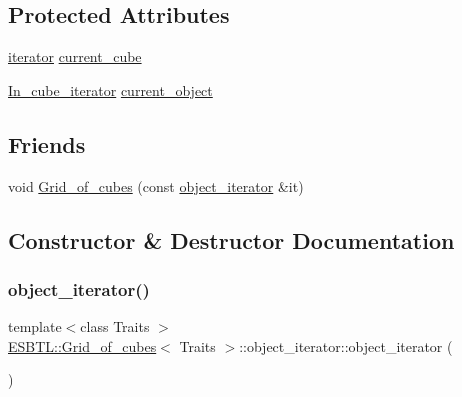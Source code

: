 \subsection*{Protected Attributes}
\begin{DoxyCompactItemize}
\item 
\hyperlink{classESBTL_1_1Grid__of__cubes_1_1iterator}{iterator} \hyperlink{classESBTL_1_1Grid__of__cubes_1_1object__iterator_abdd1562be62c036e6b6ef1c7fe331d24}{current\+\_\+cube}
\item 
\hyperlink{structESBTL_1_1Grid__of__cubes_a1586dac85e561a73b591da3cf07a47b1}{In\+\_\+cube\+\_\+iterator} \hyperlink{classESBTL_1_1Grid__of__cubes_1_1object__iterator_a80eb9046339bde86d3978c55f3578d5f}{current\+\_\+object}
\end{DoxyCompactItemize}
\subsection*{Friends}
\begin{DoxyCompactItemize}
\item 
void \hyperlink{classESBTL_1_1Grid__of__cubes_1_1object__iterator_a34522cc0511a0818c99ebcd4d1f010ec}{Grid\+\_\+of\+\_\+cubes} (const \hyperlink{classESBTL_1_1Grid__of__cubes_1_1object__iterator}{object\+\_\+iterator} \&it)
\end{DoxyCompactItemize}


\subsection{Constructor \& Destructor Documentation}
\mbox{\label{classESBTL_1_1Grid__of__cubes_1_1object__iterator_ade271a0528949eaafd1d132e923d51d3}} 
\subsubsection{\texorpdfstring{object\+\_\+iterator()}{object\_iterator()}\hspace{0.1cm}{\footnotesize\ttfamily [1/3]}}
{\footnotesize\ttfamily template$<$class Traits $>$ \\
\hyperlink{structESBTL_1_1Grid__of__cubes}{E\+S\+B\+T\+L\+::\+Grid\+\_\+of\+\_\+cubes}$<$ Traits $>$\+::object\+\_\+iterator\+::object\+\_\+iterator (\begin{DoxyParamCaption}{ }\end{DoxyParamCaption})\hspace{0.3cm}{\ttfamily [inline]}}


